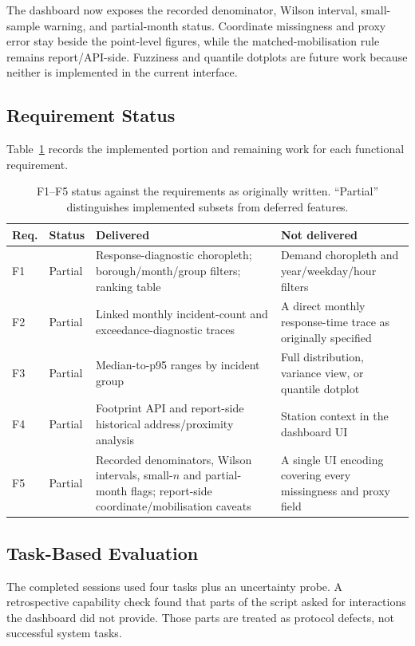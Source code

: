 The dashboard now exposes the recorded denominator, Wilson interval, small-sample warning, and partial-month status. Coordinate missingness and proxy error stay beside the point-level figures, while the matched-mobilisation rule remains report/API-side. Fuzziness and quantile dotplots are future work because neither is implemented in the current interface.

\subsection{Requirement Status}

Table~\ref{tab:req-traceability} records the implemented portion and remaining work for each functional requirement.

\begin{table}[H]
\centering
\small
\begin{tabularx}{\textwidth}{p{0.7cm}p{1.2cm}p{4.2cm}X}
\toprule
Req. & Status & Delivered & Not delivered \\
\midrule
F1 & Partial & Response-diagnostic choropleth; borough/month/group filters; ranking table & Demand choropleth and year/weekday/hour filters \\
F2 & Partial & Linked monthly incident-count and exceedance-diagnostic traces & A direct monthly response-time trace as originally specified \\
F3 & Partial & Median-to-p95 ranges by incident group & Full distribution, variance view, or quantile dotplot \\
F4 & Partial & Footprint API and report-side historical address/proximity analysis & Station context in the dashboard UI \\
F5 & Partial & Recorded denominators, Wilson intervals, small-$n$ and partial-month flags; report-side coordinate/mobilisation caveats & A single UI encoding covering every missingness and proxy field \\
\bottomrule
\end{tabularx}
\caption{F1--F5 status against the requirements as originally written. ``Partial'' distinguishes implemented subsets from deferred features.}
\label{tab:req-traceability}
\end{table}

\subsection{Task-Based Evaluation}

The completed sessions used four tasks plus an uncertainty probe. A retrospective capability check found that parts of the script asked for interactions the dashboard did not provide. Those parts are treated as protocol defects, not successful system tasks.

